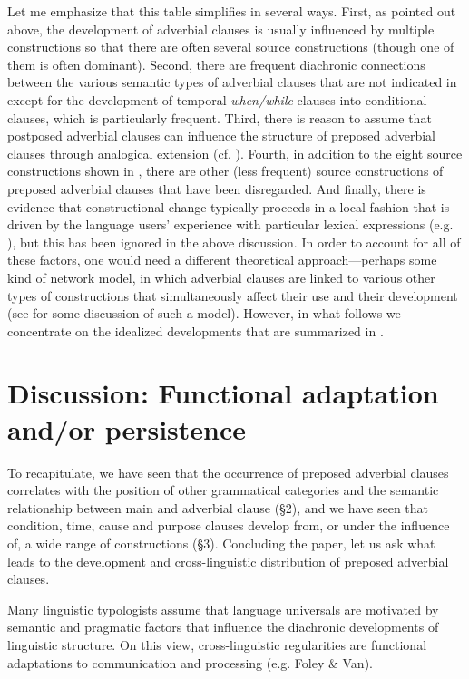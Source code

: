 \documentclass[output=paper]{langsci/langscibook}
\begin{document}
Let me emphasize that this table simplifies in several ways. First, as pointed out above, the development of adverbial clauses is usually influenced by multiple constructions so that there are often several source constructions (though one of them is often dominant). Second, there are frequent diachronic connections between the various semantic types of adverbial clauses that are not indicated in  except for the development of temporal \textit{when/while}-clauses into conditional clauses, which is particularly frequent. Third, there is reason to assume that postposed adverbial clauses can influence the structure of preposed adverbial clauses through analogical extension (cf. \citealt{Traugott1985}). Fourth, in addition to the eight source constructions shown in , there are other (less frequent) source constructions of preposed adverbial clauses that have been disregarded. And finally, there is evidence that constructional change typically proceeds in a local fashion that is driven by the language users’ experience with particular lexical expressions (e.g. \citealt{Givón1991}), but this has been ignored in the above discussion. In order to account for all of these factors, one would need a different theoretical approach—perhaps some kind of network model, in which adverbial clauses are linked to various other types of constructions that simultaneously affect their use and their development (see \citealt{Diessel2015} for some discussion of such a model). However, in what follows we concentrate on the idealized developments that are summarized in .

\section{Discussion: Functional adaptation and/or persistence}

To recapitulate, we have seen that the occurrence of preposed adverbial clauses correlates with the position of other grammatical categories and the semantic relationship between main and adverbial clause (§2), and we have seen that condition, time, cause and purpose clauses develop from, or under the influence of, a wide range of constructions (§3). Concluding the paper, let us ask what leads to the development and cross-linguistic distribution of preposed adverbial clauses.

Many linguistic typologists assume that language universals are motivated by semantic and pragmatic factors that influence the diachronic developments of linguistic structure. On this view, cross-linguistic regularities are functional adaptations to communication and processing (e.g. Foley \& Van\citealt{Valin1984,Dik1989,Hawkins2004}). 
\end{document}
